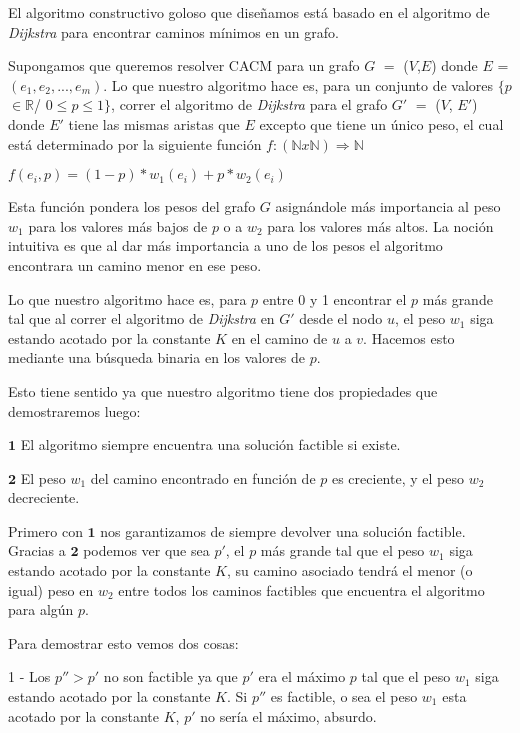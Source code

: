 El algoritmo constructivo goloso que diseñamos está basado en el algoritmo de \emph{Dijkstra} para encontrar caminos mínimos en un grafo. 

Supongamos que queremos resolver CACM para un grafo $G$ $=$ ($V$,$E$) donde $E$ = $(e_1, e_2, ..., e_m)$. Lo que nuestro algoritmo hace es, para un conjunto de valores $\{p$ $\in \mathbb{R}$/ $0 \leq p \leq 1\}$, correr el algoritmo de \emph{Dijkstra} para el grafo $G'$ $=$ ($V$, $E'$) donde $E'$ tiene las mismas aristas que $E$ excepto que tiene un único peso, el cual está determinado por la siguiente función $f: (\mathbb{N} x \mathbb{N}) \Rightarrow \mathbb{N}$

\begin{center}
$f(e_i,p) = (1-p)*w_1(e_i) + p*w_2(e_i)$
\end{center}

Esta función pondera los pesos del grafo $G$ asignándole más importancia al peso $w_1$ para los valores más bajos de $p$ o a $w_2$ para los valores más altos. La noción intuitiva es que al dar m\'as importancia a uno de los pesos el algoritmo encontrara un camino menor en ese peso.

Lo que nuestro algoritmo hace es, para $p$ entre 0 y 1 encontrar el $p$ más grande tal que al correr el algoritmo de \emph{Dijkstra} en $G'$ desde el nodo $u$, el peso $w_1$ siga estando acotado por la constante $K$ en el camino de $u$ a $v$. Hacemos esto mediante una búsqueda binaria en los valores de $p$.

Esto tiene sentido ya que nuestro algoritmo tiene dos propiedades que demostraremos luego:

$\mathbf{1}$ El algoritmo siempre encuentra una solución factible si existe.

$\mathbf{2}$ El peso $w_1$ del camino encontrado en función de $p$ es creciente, y el peso $w_2$ decreciente.

Primero con $\mathbf{1}$ nos garantizamos de siempre devolver una solución factible.
Gracias a $\mathbf{2}$ podemos ver que sea $p'$, el $p$ más grande tal que el peso $w_1$ siga estando acotado por la constante $K$, su camino asociado tendrá el menor (o igual) peso en $w_2$ entre todos los caminos factibles que encuentra el algoritmo para algún $p$.

Para demostrar esto vemos dos cosas:

1 - Los $p'' > p'$ no son factible ya que $p'$ era el m\'aximo $p$  tal que el peso $w_1$ siga estando acotado por la constante $K$. Si $p''$ es factible, o sea el peso $w_1$ esta acotado por la constante $K$, $p'$ no ser\'ia el m\'aximo, absurdo.

